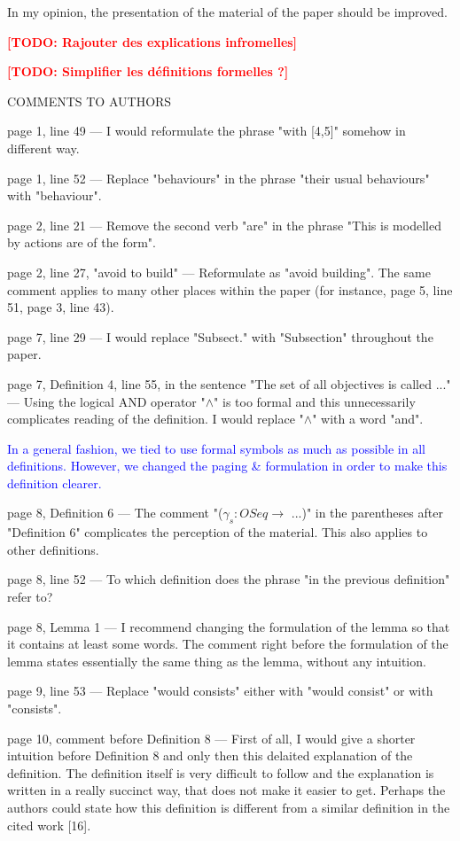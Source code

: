 \documentclass[11pt]{article}
\newcommand{\todo}[1]{\textcolor{red}{\textbf{[TODO: #1]}}}
\newcommand{\ilanswer}[1]{\textcolor{blue}{#1}}
\newcommand{\answer}[1]{\ilanswer{#1}\vspace*{1em}}
\begin{document}
In my opinion, the presentation of the material of the paper should be improved.

\todo{Rajouter des explications infromelles}

\todo{Simplifier les définitions formelles ?}

COMMENTS TO AUTHORS

page 1, line 49 ---
I would reformulate the phrase "with [4,5]" somehow in different way.

page 1, line 52 ---
Replace "behaviours" in the phrase "their usual behaviours" with "behaviour".

page 2, line 21 ---
Remove the second verb "are" in the phrase "This is modelled by actions are of the form".

page 2, line 27, "avoid to build" ---
Reformulate as "avoid building".
The same comment applies to many other places within the paper (for instance, page 5, line 51, page 3, line 43).

page 7, line 29 ---
I would replace "Subsect." with "Subsection" throughout the paper.

page 7, Definition 4, line 55, in the sentence "The set of all objectives is called ..." ---
Using the logical AND operator "$\land$" is too formal and this unnecessarily complicates reading of the definition.
I would replace "$\land$" with a word "and".

\answer{In a general fashion, we tied to use formal symbols as much as possible in all definitions.
However, we changed the paging \& formulation in order to make this definition clearer.}

page 8, Definition 6 ---
The comment "($\gamma_s: OSeq \to$ ...)" in the parentheses after "Definition 6" complicates the perception of the material. This also applies to other definitions.

page 8, line 52 ---
To which definition does the phrase "in the previous definition" refer to?

page 8, Lemma 1 ---
I recommend changing the formulation of the lemma so that it contains at least some words.
The comment right before the formulation of the lemma states essentially the same thing as the lemma, without any intuition.

page 9, line 53 ---
Replace "would consists" either with "would consist" or with "consists".

page 10, comment before Definition 8 ---
First of all, I would give a shorter intuition before Definition 8 and only then this delaited explanation of the definition. The definition itself is very difficult to follow and the explanation is written in a really succinct way, that does not make it easier to get. Perhaps the authors could state how this definition is different from a similar definition in the cited work [16].
\end{document}
